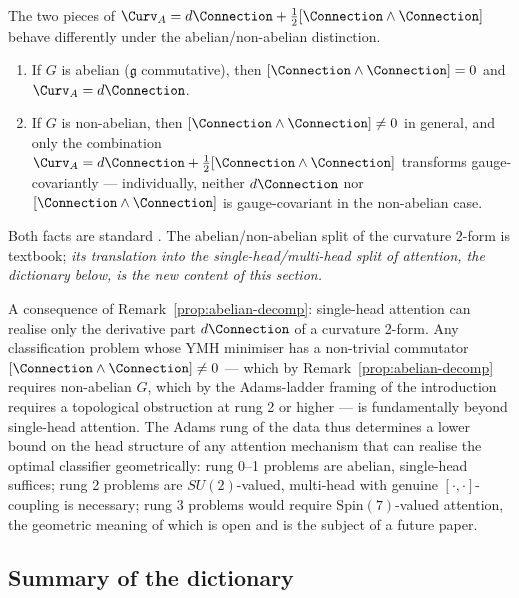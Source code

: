 \begin{remark}\label{prop:abelian-decomp}
The two pieces of $\Curv_A=d\Connection+\tfrac12[\Connection\wedge\Connection]$
behave differently under the abelian/non-abelian distinction.
\begin{enumerate}[label=(\roman*),leftmargin=2em]
\item If $G$ is abelian ($\mathfrak{g}$ commutative), then
$[\Connection\wedge\Connection]=0$ and $\Curv_A=d\Connection$.
\item If $G$ is non-abelian, then
$[\Connection\wedge\Connection]\neq 0$ in general, and only the
combination $\Curv_A=d\Connection+\tfrac12[\Connection\wedge\Connection]$
transforms gauge-covariantly --- individually, neither $d\Connection$
nor $[\Connection\wedge\Connection]$ is gauge-covariant in the
non-abelian case.
\end{enumerate}
Both facts are standard \cite[Chapter~II.5]{KobayashiNomizu}. The
abelian/non-abelian split of the curvature 2-form is textbook;
\emph{its translation into the single-head/multi-head split of
attention, the dictionary below, is the new content of this
section.}
\end{remark}

\begin{remark}
\label{rem:multihead-expressivity}
A consequence of Remark~\ref{prop:abelian-decomp}: single-head
attention can realise only the derivative part $d\Connection$ of a
curvature 2-form. Any classification problem whose YMH minimiser has
a non-trivial commutator $[\Connection\wedge\Connection]\neq 0$ ---
which by Remark~\ref{prop:abelian-decomp} requires non-abelian
$G$, which by the Adams-ladder framing of the introduction
requires a topological obstruction at rung 2 or higher --- is
fundamentally beyond single-head attention. The Adams rung of the
data thus determines a lower bound on the head structure of any
attention mechanism that can realise the optimal classifier
geometrically: rung 0--1 problems are abelian, single-head suffices;
rung 2 problems are $SU(2)$-valued, multi-head with genuine
$[\cdot,\cdot]$-coupling is necessary; rung 3 problems would require
$\mathrm{Spin}(7)$-valued attention, the geometric meaning of which
is open and is the subject of a future paper.
\end{remark}

\subsection{Summary of the dictionary}\label{ssec:attention-summary}

